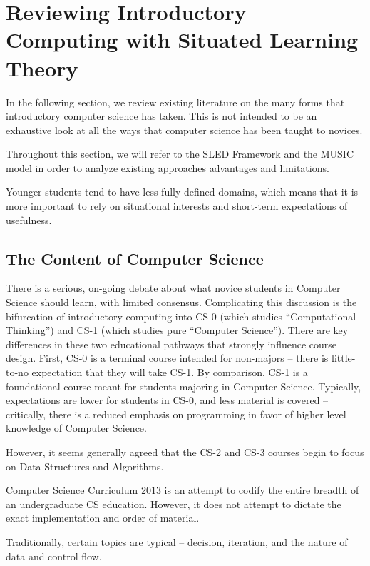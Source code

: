 \section{Reviewing Introductory Computing with Situated Learning Theory}

In the following section, we review existing literature on the many forms that introductory computer science has taken.
This is not intended to be an exhaustive look at all the ways that computer science has been taught to novices.

Throughout this section, we will refer to the SLED Framework and the MUSIC model in order to analyze existing approaches advantages and limitations.

Younger students tend to have less fully defined domains, which means that it is more important to rely on situational interests and short-term expectations of usefulness.

\subsection{The Content of Computer Science}

There is a serious, on-going debate about what novice students in Computer Science should learn, with limited consensus. 
Complicating this discussion is the bifurcation of introductory computing into CS-0 (which studies ``Computational Thinking'') and CS-1 (which studies pure ``Computer Science''). 
There are key differences in these two educational pathways that strongly influence course design.
First, CS-0 is a terminal course intended for non-majors -- there is little-to-no expectation that they will take CS-1. By comparison, CS-1 is a foundational course meant for students majoring in Computer Science. Typically, expectations are lower for students in CS-0, and less material is covered -- critically, there is a reduced emphasis on programming in favor of higher level knowledge of Computer Science.

However, it seems generally agreed that the CS-2 and CS-3 courses begin to focus on Data Structures and Algorithms.

Computer Science Curriculum 2013 \cite{CS2013} is an attempt to codify the entire breadth of an undergraduate CS education.
However, it does not attempt to dictate the exact implementation and order of material.

Traditionally, certain topics are typical -- decision, iteration, and the nature of data and control flow.

